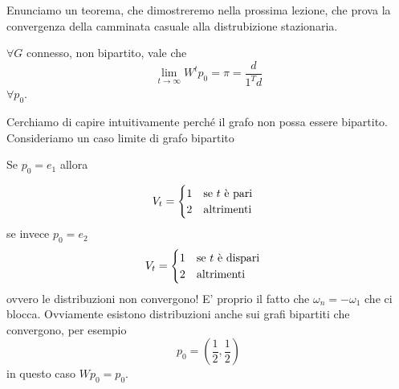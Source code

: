 \documentclass[12pt]{report}
\begin{document}
\noindent 
Enunciamo un teorema, che dimostreremo nella prossima lezione, che prova la convergenza della camminata casuale alla distrubizione stazionaria.

\begin{teo}
    $\forall G$ connesso, non bipartito,  vale che 
    $$\lim_{t\rightarrow \infty} W^t p_0 = \pi = \frac{d}{1^T d}$$
    $\forall p_0$.
\end{teo}
Cerchiamo di capire intuitivamente perché il grafo non possa essere bipartito.  Consideriamo un caso limite di grafo bipartito

Se $p_0 = e_1$ allora

$$V_t = \begin{cases}
    1 \hspace{10px} \text{se $t$ è pari} \\
    2 \hspace{10px} \text{altrimenti} 
\end{cases}$$
se invece $p_0 = e_2$
$$V_t = \begin{cases}
    1 \hspace{10px} \text{se $t$ è dispari} \\
    2 \hspace{10px} \text{altrimenti} 
\end{cases}$$
ovvero le distribuzioni non convergono! E' proprio il fatto che $\omega_n = - \omega_1$ che ci blocca. Ovviamente esistono distribuzioni anche sui grafi bipartiti che convergono, per esempio 
$$p_0=(\frac{1}{2},\frac{1}{2})$$
in questo caso $Wp_0 = p_0$.
\end{document}
